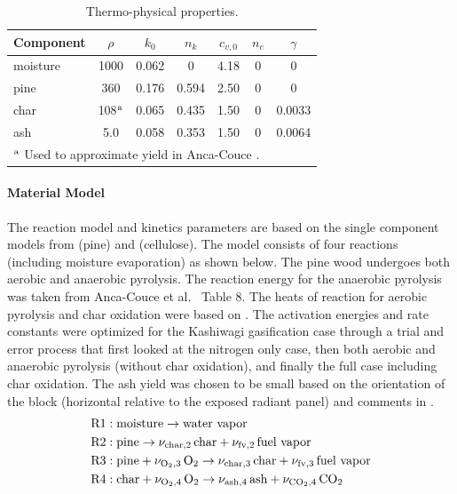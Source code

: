 \begin{table}[h]
\centering
\caption[Thermo-physical properties]{Thermo-physical properties.}
\small
\renewcommand{\arraystretch}{1.2}
\begin{tabular}{|l|c|c|c|c|c|c|}
\hline
Component& $\rho$ & $k_{0}$ & $n_k$ & $c_{v,0}$ & $n_c$ & $\gamma$ \\
\hline
moisture & 1000                         & 0.062 & 0     & 4.18 & 0 & 0       \\
pine     & 360                          & 0.176 & 0.594 & 2.50 & 0 & 0       \\
char     & 108$^{\mbox{\scriptsize a}}$ & 0.065 & 0.435 & 1.50 & 0 & 0.0033  \\
ash      & 5.0                          & 0.058 & 0.353 & 1.50 & 0 & 0.0064  \\
\hline
\multicolumn{7}{l}{$^{\mbox{\scriptsize a}}$ Used to approximate yield in Anca-Couce \cite{Anca-Couce:2012}.}
\end{tabular}
\label{tab:thermophysical_props}
\end{table}

\paragraph{Material Model}

The reaction model and kinetics parameters are based on the single component models from \cite{Anca-Couce:2012} (pine) and \cite{Kashiwagi:CF1992} (cellulose).  The model consists of four reactions (including moisture evaporation) as shown below.  The pine wood undergoes both aerobic and anaerobic pyrolysis.  The reaction energy for the anaerobic pyrolysis was taken from Anca-Couce et al.~\cite{Anca-Couce:2012} Table 8.  The heats of reaction for aerobic pyrolysis and char oxidation were based on \cite{Kashiwagi:CF1992}.  The activation energies and rate constants were optimized for the Kashiwagi gasification case \cite{Kashiwagi:1987} through a trial and error process that first looked at the nitrogen only case, then both aerobic and anaerobic pyrolysis (without char oxidation), and finally the full case including char oxidation.  The ash yield was chosen to be small based on the orientation of the block (horizontal relative to the exposed radiant panel) and comments in \cite{Kashiwagi:1987}.
\begin{align}
\mathrm{R1} &: \mbox{moisture} \rightarrow \mbox{water vapor} \\
\mathrm{R2} &: \mbox{pine} \rightarrow \nu_{\rm char,2} \,\mbox{char} + \nu_{\rm fv,2} \,\mbox{fuel vapor} \\
\mathrm{R3} &: \mbox{pine} + \nu_{{\rm O}_2,3} \, {\rm O}_2 \rightarrow \nu_{\rm char,3} \,\mbox{char} + \nu_{\rm fv,3} \,\mbox{fuel vapor} \\
\mathrm{R4} &: \mbox{char} + \nu_{{\rm O}_2,4}\,{\rm O}_2 \rightarrow \nu_{\rm ash,4} \,\mbox{ash} + \nu_{{\rm C}{\rm O}_2,4} \,{\rm C}{\rm O}_2
\end{align}

